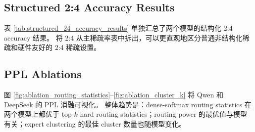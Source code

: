 \documentclass[letterpaper]{article}
\begin{document}
\subsection{Structured 2:4 Accuracy Results}

表 \ref{tab:structured_24_accuracy_results} 单独汇总了两个模型的结构化 2:4 accuracy 结果。
将 2:4 从主稀疏率表中拆出，可以更直观地区分普通非结构化稀疏和硬件友好的 2:4 稀疏设置。

\begin{table}[!t]
\centering
\scriptsize
\setlength{\tabcolsep}{3pt}
\renewcommand{\arraystretch}{1.08}
\caption{Qwen1.5-MoE-A2.7B 与 DeepSeek-V2-Lite 在结构化 2:4 稀疏下的 zero-shot accuracy（\%）结果。Avg. 为各模型所列任务的平均值；}
\label{tab:structured_24_accuracy_results}
\end{table}


\subsection{PPL Ablations}

图 \ref{fig:ablation_routing_statistics}--\ref{fig:ablation_cluster_k} 将 Qwen 和 DeepSeek 的 PPL 消融可视化。
整体趋势是：dense-softmax routing statistics 在两个模型上都优于 top-$k$ hard routing statistics；routing power 的最优值与模型有关；expert clustering 的最佳 cluster 数量也随模型变化。
\end{document}
